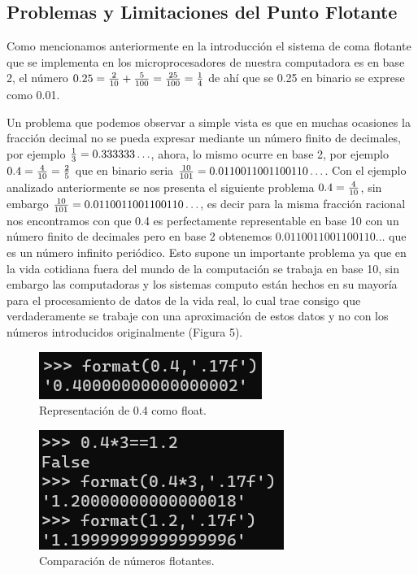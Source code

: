 \documentclass[a4paper,10pt,twocolumn]{article}
\begin{document}
\subsection{Problemas y Limitaciones del Punto Flotante}\label{sub:problems_limitations}
	Como mencionamos anteriormente en la introducción el sistema de coma flotante que se implementa en los microprocesadores de nuestra computadora es en base 2, el número $0.25={2\over 10}+{5\over 100}={25\over 100}={1\over 4}$ de ahí que se 0.25 en binario se exprese como 0.01. 
	
	Un problema que podemos observar a simple vista es que en muchas ocasiones la fracción decimal no se pueda expresar mediante un número finito de decimales, por ejemplo ${1\over 3}=0.333333\ldots$, ahora, lo mismo ocurre en base 2, por ejemplo $0.4={4\over 10}={2\over 5}$ que en binario seria ${10\over 101}=0.0110011001100110\ldots$. Con el ejemplo analizado anteriormente se nos presenta el siguiente problema $0.4={4\over 10}$, sin embargo ${10\over 101}=0.0110011001100110\ldots$, es decir para la misma fracción racional nos encontramos con que 0.4 es perfectamente representable en base 10 con un número finito de decimales pero en base 2 obtenemos $0.0110011001100110\ldots$ que es un número infinito periódico. Esto supone un importante problema ya que en la vida cotidiana fuera del mundo de la computación se trabaja en base 10, sin embargo las computadoras y los sistemas computo están hechos en su mayoría para el procesamiento de datos de la vida real, lo cual trae consigo que verdaderamente se trabaje con una aproximación de estos datos y no con los números introducidos originalmente (Figura 5).
	
	\begin{figure}
		\begin{center}
			\includegraphics[scale=1]{recourses/repre04.png}
			\caption{Representación de 0.4 como float.\label{fig:code}}
		\end{center}
	\end{figure}
	
	\begin{figure}
		\begin{center}
			\includegraphics[scale=1]{recourses/comp04mult3.png}
			\caption{Comparación de números flotantes.\label{fig:code}}
		\end{center}
	\end{figure}
	
\end{document}
